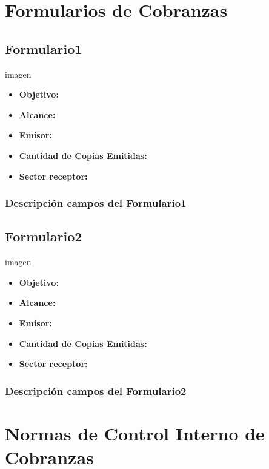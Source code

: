 \pagebreak
\section{Formularios de Cobranzas}
\subsection{Formulario1}
imagen
\begin{itemize}
  \item \textbf{Objetivo:}
  \item \textbf{Alcance:}
  \item \textbf{Emisor:}
  \item \textbf{Cantidad de Copias Emitidas:}
  \item \textbf{Sector receptor:}
 \end{itemize}
\subsubsection{Descripci\'on campos del Formulario1}

\subsection{Formulario2}
imagen
\begin{itemize}
  \item \textbf{Objetivo:}
  \item \textbf{Alcance:}
  \item \textbf{Emisor:}
  \item \textbf{Cantidad de Copias Emitidas:}
  \item \textbf{Sector receptor:}
 \end{itemize}
\subsubsection{Descripci\'on campos del Formulario2}

\pagebreak
\section{Normas de Control Interno de Cobranzas}
